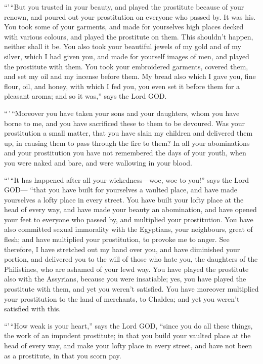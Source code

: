 ``'\,``But you trusted in your beauty, and played the
prostitute because of your renown, and poured out your prostitution on
everyone who passed by. It was his.  You took some of your
garments, and made for yourselves high places decked with various
colours, and played the prostitute on them. This shouldn't happen,
neither shall it be.  You also took your beautiful jewels
of my gold and of my silver, which I had given you, and made for
yourself images of men, and played the prostitute with them.
 You took your embroidered garments, covered them, and set
my oil and my incense before them.  My bread also which I
gave you, fine flour, oil, and honey, with which I fed you, you even set
it before them for a pleasant aroma; and so it was,'' says the Lord GOD.

 ``\,'\,``Moreover you have taken your sons and your
daughters, whom you have borne to me, and you have sacrificed these to
them to be devoured. Was your prostitution a small matter, 
that you have slain my children and delivered them up, in causing them
to pass through the fire to them?  In all your abominations
and your prostitution you have not remembered the days of your youth,
when you were naked and bare, and were wallowing in your blood.

 ``'\,``It has happened after all your wickedness---woe,
woe to you!'' says the Lord GOD---  ``that you have built
for yourselves a vaulted place, and have made yourselves a lofty place
in every street.  You have built your lofty place at the
head of every way, and have made your beauty an abomination, and have
opened your feet to everyone who passed by, and multiplied your
prostitution.  You have also committed sexual immorality
with the Egyptians, your neighbours, great of flesh; and have multiplied
your prostitution, to provoke me to anger.  See therefore,
I have stretched out my hand over you, and have diminished your portion,
and delivered you to the will of those who hate you, the daughters of
the Philistines, who are ashamed of your lewd way.  You
have played the prostitute also with the Assyrians, because you were
insatiable; yes, you have played the prostitute with them, and yet you
weren't satisfied.  You have moreover multiplied your
prostitution to the land of merchants, to Chaldea; and yet you weren't
satisfied with this.

 ``'\,``How weak is your heart,'' says the Lord GOD,
``since you do all these things, the work of an impudent prostitute;
 in that you build your vaulted place at the head of every
way, and make your lofty place in every street, and have not been as a
prostitute, in that you scorn pay.

